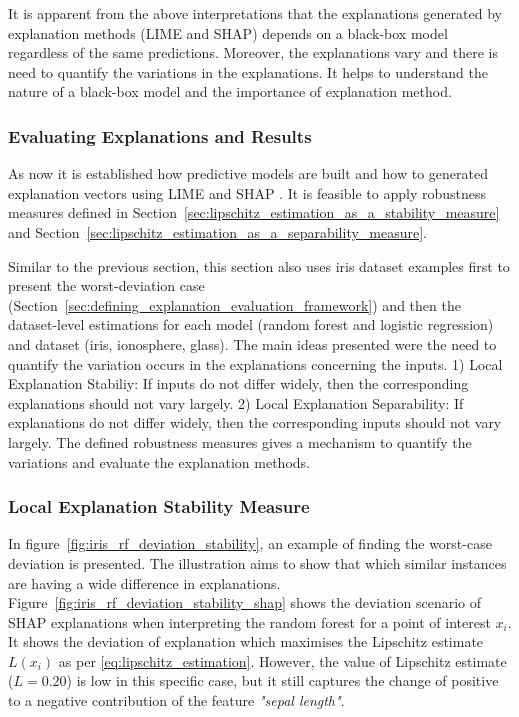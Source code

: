 \documentclass[english]{tktltiki2}
\theoremstyle{definition}
\theoremstyle{remark}
\begin{document}
It is apparent from the above interpretations that the explanations generated by explanation methods (LIME and SHAP) depends on a black-box model regardless of the same predictions. Moreover, the explanations vary and there is need to quantify the variations in the explanations. It helps to understand the nature of a black-box model and the importance of explanation method.

\subsubsection{Evaluating Explanations and Results}\label{sec:evaluating_explanations_and_results_part1}
As now it is established how predictive models are built and how to generated explanation vectors using LIME \citep{ribeiro2016should} and SHAP \citep{lundberg2017unified}. It is feasible to apply robustness measures defined in Section~\ref{sec:lipschitz_estimation_as_a_stability_measure} \citep{alvarez2018robustness} and Section~\ref{sec:lipschitz_estimation_as_a_separability_measure}.

Similar to the previous section, this section also uses iris dataset examples first to present the worst-deviation case (Section~\ref{sec:defining_explanation_evaluation_framework}) and then the dataset-level estimations for each model (random forest and logistic regression) and dataset (iris, ionosphere, glass).
The main ideas presented were the need to quantify the variation occurs in the explanations concerning the inputs. 1) Local Explanation Stabiliy: If inputs do not differ widely, then the corresponding explanations should not vary largely. 2) Local Explanation Separability: If explanations do not differ widely, then the corresponding inputs should not vary largely. The defined robustness measures gives a mechanism to quantify the variations and evaluate the explanation methods.

\subsubsection*{Local Explanation Stability Measure}
In figure~\ref{fig:iris_rf_deviation_stability}, an example of finding the worst-case deviation is presented. The illustration aims to show that which similar instances are having a wide difference in explanations.  Figure~\ref{fig:iris_rf_deviation_stability_shap} shows the deviation scenario of SHAP explanations when interpreting the random forest for a point of interest $x_i$. It shows the deviation of explanation which maximises the Lipschitz estimate $L(x_i)$ as per \eqref{eq:lipschitz_estimation}. However, the value of Lipschitz estimate ($L=0.20$) is low in this specific case, but it still captures the change of positive to a negative contribution of the feature \textit{"sepal length"}.
\end{document}
